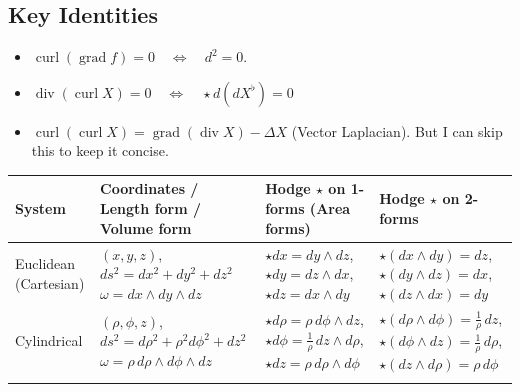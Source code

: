 \documentclass[12pt]{article}
\begin{document}
\subsection*{Key Identities}
\begin{itemize}
	\item $\operatorname{curl}(\operatorname{grad} f) = 0 \quad \Longleftrightarrow \quad d^2 = 0$.
	\item $\operatorname{div}(\operatorname{curl} X) = 0 \quad \Longleftrightarrow \quad  \star d (d X^\flat)  = 0$
	\item $\operatorname{curl}(\operatorname{curl} X) = \operatorname{grad}(\operatorname{div} X) - \Delta X$ (Vector Laplacian). But I can skip this to keep it concise.
\end{itemize}
\newpage

\begin{table}[!htbp]
	\centering
	\small
	\setlength{\tabcolsep}{4pt}
	\begin{tabular}{>{\raggedright\arraybackslash}p{2.7cm} 
			>{\raggedright\arraybackslash}p{5cm} 
			>{\raggedright\arraybackslash}p{6cm} 
			>{\raggedright\arraybackslash}p{5cm}}
		\toprule
		\textbf{System} & 
		\textbf{Coordinates / Length form / Volume form} & 
		\textbf{Hodge $\star$ on 1-forms (Area forms)} & 
		\textbf{Hodge $\star$ on 2-forms} \\
		\midrule
		
		Euclidean (Cartesian) &
		\( (x,y,z) \), \quad \( ds^2 = dx^2 + dy^2 + dz^2 \) \newline
		\( \omega = dx \wedge dy \wedge dz \) &
		\( \star dx = dy \wedge dz \), \newline
		\( \star dy = dz \wedge dx \), \newline
		\( \star dz = dx \wedge dy \) &
		\( \star(dx \wedge dy) = dz \), \newline
		\( \star(dy \wedge dz) = dx \), \newline
		\( \star(dz \wedge dx) = dy \) \\
		\addlinespace
		
		Cylindrical &
		\( (\rho,\phi,z) \), \quad \( ds^2 = d\rho^2 + \rho^2 d\phi^2 + dz^2 \) \newline
		\( \omega = \rho\, d\rho \wedge d\phi \wedge dz \) &
		\( \star d\rho = \rho\, d\phi \wedge dz \), \newline
		\( \star d\phi = \frac{1}{\rho}\, dz \wedge d\rho \), \newline
		\( \star dz = \rho\, d\rho \wedge d\phi \) &
		\( \star(d\rho \wedge d\phi) = \frac{1}{\rho}\, dz \), \newline
		\( \star(d\phi \wedge dz) = \frac{1}{\rho}\, d\rho \), \newline
		\( \star(dz \wedge d\rho) = \rho\, d\phi \) \\
		\addlinespace
		

\end{tabular}
\end{table}
\end{document}
